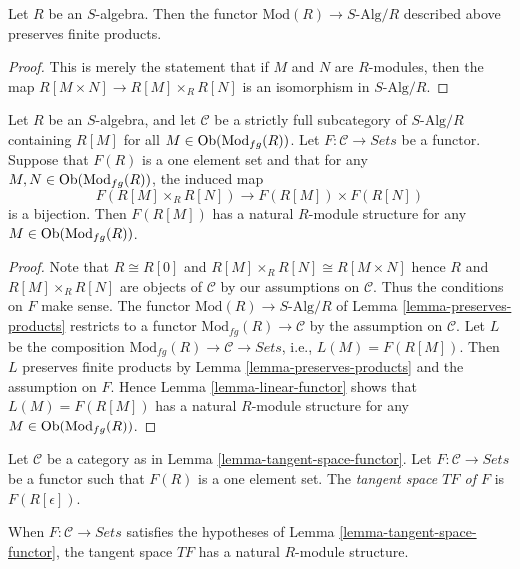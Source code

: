 \begin{lemma}
\label{lemma-preserves-products}
Let $R$ be an $S$-algebra. Then the functor
$\text{Mod}(R) \to S\text{-Alg}/R$ described above preserves finite products.
\end{lemma}

\begin{proof}
This is merely the statement that if $M$ and $N$ are $R$-modules, then the map
$R[M \times N] \to R[M] \times_R R[N]$ is an isomorphism in
$S\text{-Alg}/R$.
\end{proof}

\begin{lemma}
\label{lemma-tangent-space-functor}
Let $R$ be an $S$-algebra, and let $\mathcal{C}$ be a strictly full
subcategory of $S\text{-Alg}/R$ containing $R[M]$ for all
$M \in \mathop{\rm Ob}\nolimits(\text{Mod}_{fg}(R))$.
Let $F: \mathcal{C} \to \textit{Sets}$ be a functor. Suppose that
$F(R)$ is a one element set and that for any $M, N \in
\mathop{\rm Ob}\nolimits(\text{Mod}_{fg}(R))$, the induced map
$$
F(R[M] \times_R R[N]) \to F(R[M]) \times F(R[N])
$$
is a bijection. Then $F(R[M])$ has a natural $R$-module structure for any $M
\in \mathop{\rm Ob}\nolimits(\text{Mod}_{fg}(R))$.
\end{lemma}

\begin{proof}
Note that $R \cong R[0]$ and $R[M] \times_R R[N] \cong R[M \times N]$ hence
$R$ and $R[M] \times_R R[N]$ are objects of $\mathcal{C}$ by our assumptions on
$\mathcal{C}$. Thus the conditions on $F$ make sense.
The functor $\text{Mod}(R) \to S\text{-Alg}/R$ of
Lemma \ref{lemma-preserves-products}
restricts to a functor $\text{Mod}_{fg}(R) \to \mathcal{C}$
by the assumption on $\mathcal{C}$. Let $L$ be the composition
$\text{Mod}_{fg}(R) \to \mathcal{C} \to \textit{Sets}$, i.e.,
$L(M) = F(R[M])$.
Then $L$ preserves finite products by
Lemma \ref{lemma-preserves-products}
and the assumption on $F$. Hence
Lemma \ref{lemma-linear-functor}
shows that $L(M) = F(R[M])$ has a natural $R$-module structure for any
$M \in \mathop{\rm Ob}\nolimits(\text{Mod}_{fg}(R))$.
\end{proof}

\begin{definition}
\label{definition-tangent-space-over-R}
Let $\mathcal{C}$ be a category as in
Lemma \ref{lemma-tangent-space-functor}.
Let $F : \mathcal{C} \to \textit{Sets}$ be a functor such that
$F(R)$ is a one element set. The {\it tangent space $TF$ of $F$} is
$F(R[\epsilon])$.
\end{definition}

\noindent
When $F : \mathcal{C} \to \textit{Sets}$ satisfies the hypotheses of
Lemma \ref{lemma-tangent-space-functor},
the tangent space $TF$ has a natural $R$-module structure.

